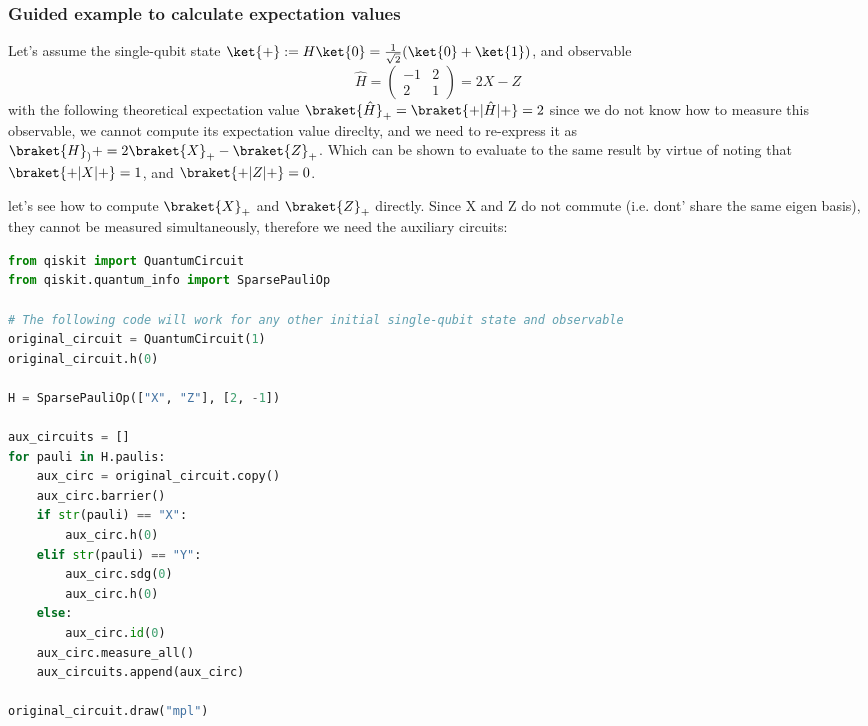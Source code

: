 \documentclass[12pt, oneside]{book}
\theoremstyle{definition}
\theoremstyle{definition}
\theoremstyle{remark}
\begin{document}
\subsubsection{Guided example to calculate expectation values}
Let's assume the single-qubit state $\ket{+}:=H\ket{0}=\frac{1}{\sqrt{2}}(\ket{0}+\ket{1})$, and observable
\[
\hat{H}=\begin{pmatrix} -1 & 2 \\ 2 & 1 \end{pmatrix}=2X-Z
\]
with the following theoretical expectation value $\braket{\hat{H}}_{+}=\braket{+|\hat{H}|+}=2$
since we do not know how to measure this observable, we cannot compute its expectation value direclty, and we need to re-express it as $\braket{H}_){+}=2\braket{X}_{+}-\braket{Z}_{+}$. Which can be shown to evaluate to the same result by virtue of noting that $\braket{+|X|+}=1$, and $\braket{+|Z|+}=0$.

let's see how to compute $\braket{X}_+$ and $\braket{Z}_+$ directly. Since X and Z do not commute (i.e. dont' share the same eigen basis), they cannot be measured simultaneously, therefore we need the auxiliary circuits:
\begin{lstlisting}[language=Python]
from qiskit import QuantumCircuit
from qiskit.quantum_info import SparsePauliOp

# The following code will work for any other initial single-qubit state and observable
original_circuit = QuantumCircuit(1)
original_circuit.h(0)

H = SparsePauliOp(["X", "Z"], [2, -1])

aux_circuits = []
for pauli in H.paulis:
    aux_circ = original_circuit.copy()
    aux_circ.barrier()
    if str(pauli) == "X":
        aux_circ.h(0)
    elif str(pauli) == "Y":
        aux_circ.sdg(0)
        aux_circ.h(0)
    else:
        aux_circ.id(0)
    aux_circ.measure_all()
    aux_circuits.append(aux_circ)

original_circuit.draw("mpl")
\end{lstlisting}
\end{document}
